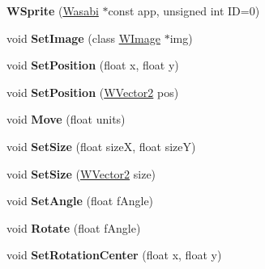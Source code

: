 \begin{DoxyCompactItemize}
\item 
{\bfseries W\+Sprite} (\hyperlink{class_wasabi}{Wasabi} $\ast$const app, unsigned int ID=0)\hypertarget{class_w_sprite_a3352478b41a564541114180ddf1b1548}{}\label{class_w_sprite_a3352478b41a564541114180ddf1b1548}

\item 
void {\bfseries Set\+Image} (class \hyperlink{class_w_image}{W\+Image} $\ast$img)\hypertarget{class_w_sprite_a9aea47963b1ebeb6c0487e0333a608f1}{}\label{class_w_sprite_a9aea47963b1ebeb6c0487e0333a608f1}

\item 
void {\bfseries Set\+Position} (float x, float y)\hypertarget{class_w_sprite_ac8449ad7be07a7b4f7008f1992606311}{}\label{class_w_sprite_ac8449ad7be07a7b4f7008f1992606311}

\item 
void {\bfseries Set\+Position} (\hyperlink{class_w_vector2}{W\+Vector2} pos)\hypertarget{class_w_sprite_ac52fff843f03e47bd256c3c6f9c27c3d}{}\label{class_w_sprite_ac52fff843f03e47bd256c3c6f9c27c3d}

\item 
void {\bfseries Move} (float units)\hypertarget{class_w_sprite_accec49ed55eb10d2b56869e01d704e59}{}\label{class_w_sprite_accec49ed55eb10d2b56869e01d704e59}

\item 
void {\bfseries Set\+Size} (float sizeX, float sizeY)\hypertarget{class_w_sprite_a06465b7c0c35804ff53ff18513a1c6d9}{}\label{class_w_sprite_a06465b7c0c35804ff53ff18513a1c6d9}

\item 
void {\bfseries Set\+Size} (\hyperlink{class_w_vector2}{W\+Vector2} size)\hypertarget{class_w_sprite_a68082dd458205f65f78ef61fcdbe08a9}{}\label{class_w_sprite_a68082dd458205f65f78ef61fcdbe08a9}

\item 
void {\bfseries Set\+Angle} (float f\+Angle)\hypertarget{class_w_sprite_a4121379dfb1a6cc0d37dbc653cf661c1}{}\label{class_w_sprite_a4121379dfb1a6cc0d37dbc653cf661c1}

\item 
void {\bfseries Rotate} (float f\+Angle)\hypertarget{class_w_sprite_acd1f6c6dae9f3bbda34257a9c180bf89}{}\label{class_w_sprite_acd1f6c6dae9f3bbda34257a9c180bf89}

\item 
void {\bfseries Set\+Rotation\+Center} (float x, float y)\hypertarget{class_w_sprite_a66673ab8b01c32604d206a0fb7a7e554}{}\label{class_w_sprite_a66673ab8b01c32604d206a0fb7a7e554}


\end{DoxyCompactItemize}
